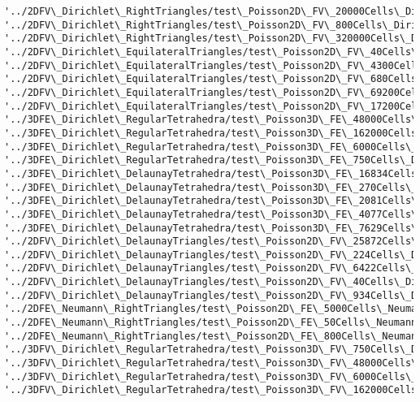 \documentclass[11pt]{article}
\begin{document}
\begin{Verbatim}[commandchars=\\\{\}]
'../2DFV\_Dirichlet\_RightTriangles/test\_Poisson2D\_FV\_20000Cells\_Dirichlet\_Regular\_RightTriangles.json', '../2DFV\_Dirichlet\_RightTriangles/test\_Poisson2D\_FV\_800Cells\_Dirichlet\_Regular\_RightTriangles.json', '../2DFV\_Dirichlet\_RightTriangles/test\_Poisson2D\_FV\_320000Cells\_Dirichlet\_Regular\_RightTriangles.json', '../2DFV\_Dirichlet\_EquilateralTriangles/test\_Poisson2D\_FV\_40Cells\_Dirichlet\_Structured\_triangles.json', '../2DFV\_Dirichlet\_EquilateralTriangles/test\_Poisson2D\_FV\_4300Cells\_Dirichlet\_Structured\_triangles.json', '../2DFV\_Dirichlet\_EquilateralTriangles/test\_Poisson2D\_FV\_680Cells\_Dirichlet\_Structured\_triangles.json', '../2DFV\_Dirichlet\_EquilateralTriangles/test\_Poisson2D\_FV\_69200Cells\_Dirichlet\_Structured\_triangles.json', '../2DFV\_Dirichlet\_EquilateralTriangles/test\_Poisson2D\_FV\_17200Cells\_Dirichlet\_Structured\_triangles.json', '../3DFE\_Dirichlet\_RegularTetrahedra/test\_Poisson3D\_FE\_48000Cells\_Dirichlet\_Regular\_Tetrahedra.json', '../3DFE\_Dirichlet\_RegularTetrahedra/test\_Poisson3D\_FE\_162000Cells\_Dirichlet\_Regular\_Tetrahedra.json', '../3DFE\_Dirichlet\_RegularTetrahedra/test\_Poisson3D\_FE\_6000Cells\_Dirichlet\_Regular\_Tetrahedra.json', '../3DFE\_Dirichlet\_RegularTetrahedra/test\_Poisson3D\_FE\_750Cells\_Dirichlet\_Regular\_Tetrahedra.json', '../3DFE\_Dirichlet\_DelaunayTetrahedra/test\_Poisson3D\_FE\_16834Cells\_Dirichlet\_Unstructured\_Tetrahedra.json', '../3DFE\_Dirichlet\_DelaunayTetrahedra/test\_Poisson3D\_FE\_270Cells\_Dirichlet\_Unstructured\_Tetrahedra.json', '../3DFE\_Dirichlet\_DelaunayTetrahedra/test\_Poisson3D\_FE\_2081Cells\_Dirichlet\_Unstructured\_Tetrahedra.json', '../3DFE\_Dirichlet\_DelaunayTetrahedra/test\_Poisson3D\_FE\_4077Cells\_Dirichlet\_Unstructured\_Tetrahedra.json', '../3DFE\_Dirichlet\_DelaunayTetrahedra/test\_Poisson3D\_FE\_7629Cells\_Dirichlet\_Unstructured\_Tetrahedra.json', '../2DFV\_Dirichlet\_DelaunayTriangles/test\_Poisson2D\_FV\_25872Cells\_Dirichlet\_Unstructured\_triangles.json', '../2DFV\_Dirichlet\_DelaunayTriangles/test\_Poisson2D\_FV\_224Cells\_Dirichlet\_Unstructured\_triangles.json', '../2DFV\_Dirichlet\_DelaunayTriangles/test\_Poisson2D\_FV\_6422Cells\_Dirichlet\_Unstructured\_triangles.json', '../2DFV\_Dirichlet\_DelaunayTriangles/test\_Poisson2D\_FV\_40Cells\_Dirichlet\_Unstructured\_triangles.json', '../2DFV\_Dirichlet\_DelaunayTriangles/test\_Poisson2D\_FV\_934Cells\_Dirichlet\_Unstructured\_triangles.json', '../2DFE\_Neumann\_RightTriangles/test\_Poisson2D\_FE\_5000Cells\_Neumann\_Regular\_RightTriangles.json', '../2DFE\_Neumann\_RightTriangles/test\_Poisson2D\_FE\_50Cells\_Neumann\_Regular\_RightTriangles.json', '../2DFE\_Neumann\_RightTriangles/test\_Poisson2D\_FE\_800Cells\_Neumann\_Regular\_RightTriangles.json', '../3DFV\_Dirichlet\_RegularTetrahedra/test\_Poisson3D\_FV\_750Cells\_Dirichlet\_Regular\_Tetrahedra.json', '../3DFV\_Dirichlet\_RegularTetrahedra/test\_Poisson3D\_FV\_48000Cells\_Dirichlet\_Regular\_Tetrahedra.json', '../3DFV\_Dirichlet\_RegularTetrahedra/test\_Poisson3D\_FV\_6000Cells\_Dirichlet\_Regular\_Tetrahedra.json', '../3DFV\_Dirichlet\_RegularTetrahedra/test\_Poisson3D\_FV\_162000Cells\_Dirichlet\_Regular\_Tetrahedra.json', 
\end{Verbatim}
\end{document}
